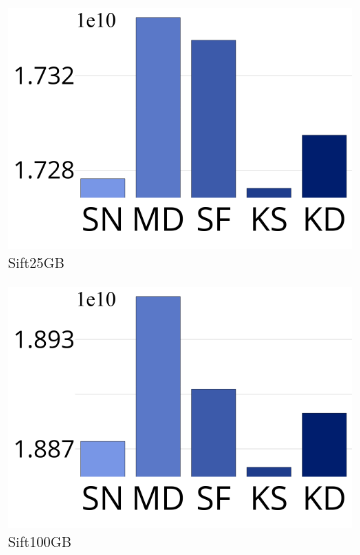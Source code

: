 \begin{figure}[htp]
\begin{subfigure}{0.018\columnwidth}
   \vspace{0.2in}
		\end{subfigure}	
		\begin{subfigure}{\sfig\columnwidth}
			\centering
			\captionsetup{justification=centering}	
			\includegraphics[width=\textwidth]{../img/Experiments/EP/SIFT_25GB_100.png}
		\caption{{Sift25GB}}
		\label{fig:ss:sift1b}
		\end{subfigure}	
		\begin{subfigure}{\sfig\columnwidth}
			\centering
			\captionsetup{justification=centering}	
			\includegraphics[width=\textwidth]{../img/Experiments/EP/SIFT_100GB_100.png}
		\caption{{Sift100GB}}
		\label{fig:ss:sift1b}
		\end{subfigure}		
		\begin{subfigure}{\sfig\columnwidth}

\end{subfigure}
\end{figure}
